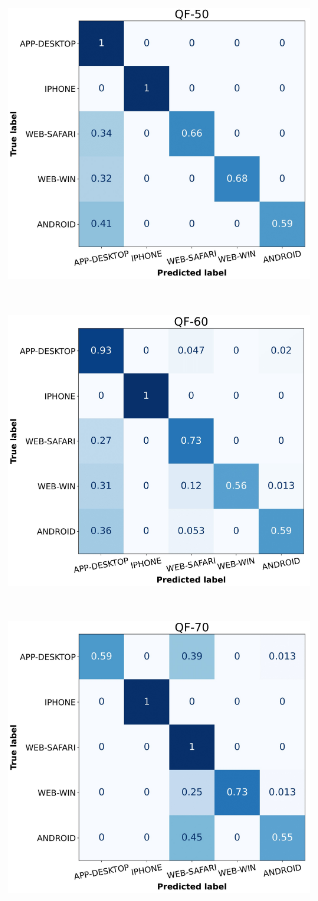 \vspace{3em}

\begingroup
    \centering
    \includegraphics[width=8cm, height=8cm, keepaspectratio]{Immagini/Classificazione/confusion_matrix_SVM_QF-50.jpg}\ \ \ \ \
    \includegraphics[width=8cm, height=8cm, keepaspectratio]{Immagini/Classificazione/confusion_matrix_SVM_QF-60.jpg}\\\vspace{1em}
    \includegraphics[width=8cm, height=8cm, keepaspectratio]{Immagini/Classificazione/confusion_matrix_SVM_QF-70.jpg}\ \ \ \ \
